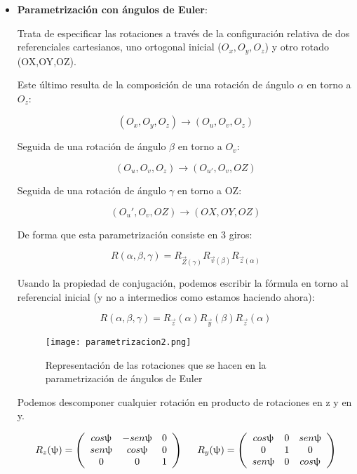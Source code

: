 \documentclass{article}
\begin{document}
\begin{itemize}
\item \textbf{Parametrización con ángulos de Euler}:

Trata de especificar las rotaciones a través de la configuración relativa de dos referenciales cartesianos, uno ortogonal inicial ($O_x,O_y,O_z$) y otro rotado (OX,OY,OZ).

Este último resulta de la composición de una rotación de ángulo $\alpha$ en torno a $O_z$:

$$ (O_x,O_y,O_z) \longrightarrow (O_u,O_v,O_z)$$

Seguida de una rotación de ángulo $\beta$ en torno a $O_v$:

$$(O_u,O_v,O_z) \longrightarrow (O_{u'},O_v,OZ)$$

Seguida de una rotación de ángulo $\gamma$ en torno a OZ:

$$(O_u',O_v,OZ) \longrightarrow (OX,OY,OZ)$$

De forma que esta parametrización consiste en 3 giros:

$$R(\alpha, \beta , \gamma)=R_{\Vec{Z}(\gamma)}R_{\Vec{v}(\beta)}R_{\Vec{z}(\alpha)}$$

Usando la propiedad de conjugación, podemos escribir la fórmula en torno al referencial inicial (y no a intermedios como estamos haciendo ahora):

$$R(\alpha, \beta , \gamma)=R_{\Vec{z}}(\alpha)R_{\Vec{y}}(\beta)R_{\Vec{z}}(\alpha)$$

\begin{figure}[h!]
    \centering
 \texttt{[image: parametrizacion2.png]}
    \caption{Representación de las rotaciones que se hacen en la parametrización de ángulos de Euler}
    \label{fig:my_label}
\end{figure}

\newpage
Podemos descomponer cualquier rotación en producto de rotaciones en z y en y.

$$R_{z}(\uppsi )=\left ( \begin{array}{ccc}
     cos \uppsi & -sen \uppsi  & 0 \\
     sen \uppsi & cos \uppsi & 0 \\
     0 & 0 & 1
\end{array}\right) \hspace{0.5cm} R_{y}(\uppsi )=\left ( \begin{array}{ccc}
     cos \uppsi & 0 & sen \uppsi \\
     0 & 1 & 0 \\
     sen \uppsi & 0 & cos \uppsi
\end{array}\right)$$
\end{itemize}
\end{document}
